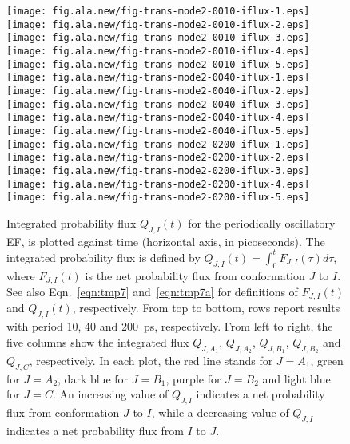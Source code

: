 \documentclass[a4paper,preprint,unsortedaddress,onecolumn]{revtex4-1}
\begin{document}
\begin{figure}
  \centering
  \texttt{[image: fig.ala.new/fig-trans-mode2-0010-iflux-1.eps]}
  \texttt{[image: fig.ala.new/fig-trans-mode2-0010-iflux-2.eps]}
  \texttt{[image: fig.ala.new/fig-trans-mode2-0010-iflux-3.eps]}
  \texttt{[image: fig.ala.new/fig-trans-mode2-0010-iflux-4.eps]}
  \texttt{[image: fig.ala.new/fig-trans-mode2-0010-iflux-5.eps]}\\
  \texttt{[image: fig.ala.new/fig-trans-mode2-0040-iflux-1.eps]}
  \texttt{[image: fig.ala.new/fig-trans-mode2-0040-iflux-2.eps]}
  \texttt{[image: fig.ala.new/fig-trans-mode2-0040-iflux-3.eps]}
  \texttt{[image: fig.ala.new/fig-trans-mode2-0040-iflux-4.eps]}
  \texttt{[image: fig.ala.new/fig-trans-mode2-0040-iflux-5.eps]}\\
  \texttt{[image: fig.ala.new/fig-trans-mode2-0200-iflux-1.eps]}
  \texttt{[image: fig.ala.new/fig-trans-mode2-0200-iflux-2.eps]}
  \texttt{[image: fig.ala.new/fig-trans-mode2-0200-iflux-3.eps]}
  \texttt{[image: fig.ala.new/fig-trans-mode2-0200-iflux-4.eps]}
  \texttt{[image: fig.ala.new/fig-trans-mode2-0200-iflux-5.eps]}\\
  \caption{
    Integrated probability flux $Q_{J,I}(t)$ for the periodically
    oscillatory EF, is plotted against time (horizontal axis, in picoseconds).
    The integrated
    probability flux is defined by $Q_{J,I}(t) = \int_0^t F_{J,I}(\tau) d\tau$, where
    $F_{J,I}(t)$ is the net probability flux from conformation $J$ to $I$.
    See also Eqn.~\eqref{eqn:tmp7} and~\eqref{eqn:tmp7a} for definitions
    of $F_{J,I}(t)$ and $Q_{J,I}(t)$, respectively.
    From top to bottom, rows report results with  period 10, 40 and 200~ps, respectively.
    From left to right, the five
    columns show the integrated flux $Q_{J,A_1}$, $Q_{J,A_2}$,
    $Q_{J,B_1}$, $Q_{J,B_2}$ and $Q_{J,C}$, respectively. In each plot,
    the red line stands for $J=A_1$, green for $J=A_2$, dark blue for $J=B_1$,
    purple for $J=B_2$ and light blue for $J=C$.
    An increasing value of $Q_{J,I}$ indicates a net probability
      flux from conformation $J$ to $I$,
      while a decreasing value of $Q_{J,I}$ indicates a net probability
      flux from $I$ to $J$.
  }
  \label{fig:tmp10}
\end{figure}
\end{document}
